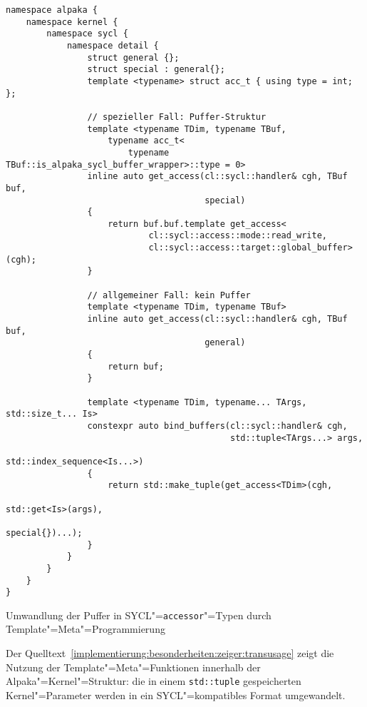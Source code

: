 \begin{code}
    \begin{verbatim}
namespace alpaka {
    namespace kernel {
        namespace sycl {
            namespace detail {
                struct general {};
                struct special : general{};
                template <typename> struct acc_t { using type = int; };

                // spezieller Fall: Puffer-Struktur
                template <typename TDim, typename TBuf,
                    typename acc_t<
                        typename TBuf::is_alpaka_sycl_buffer_wrapper>::type = 0>
                inline auto get_access(cl::sycl::handler& cgh, TBuf buf,
                                       special)
                {
                    return buf.buf.template get_access<
                            cl::sycl::access::mode::read_write,
                            cl::sycl::access::target::global_buffer>(cgh);
                }

                // allgemeiner Fall: kein Puffer
                template <typename TDim, typename TBuf>
                inline auto get_access(cl::sycl::handler& cgh, TBuf buf,
                                       general)
                {
                    return buf;
                }

                template <typename TDim, typename... TArgs, std::size_t... Is>
                constexpr auto bind_buffers(cl::sycl::handler& cgh,
                                            std::tuple<TArgs...> args,
                                            std::index_sequence<Is...>)
                {
                    return std::make_tuple(get_access<TDim>(cgh,
                                                            std::get<Is>(args),
                                                            special{})...);
                }
            }
        }
    }
}
    \end{verbatim}
    \caption{Umwandlung der Puffer in SYCL"=\texttt{accessor}"=Typen durch
             Template"=Meta"=Programmierung}
    \label{implementierung:besonderheiten:zeiger:wrappertrans}
\end{code}

Der Quelltext~\ref{implementierung:besonderheiten:zeiger:transusage} zeigt die
Nutzung der Template"=Meta"=Funktionen innerhalb der Alpaka"=Kernel"=Struktur:
die in einem \texttt{std::tuple} gespeicherten Kernel"=Parameter werden in ein
SYCL"=kompatibles Format umgewandelt.

